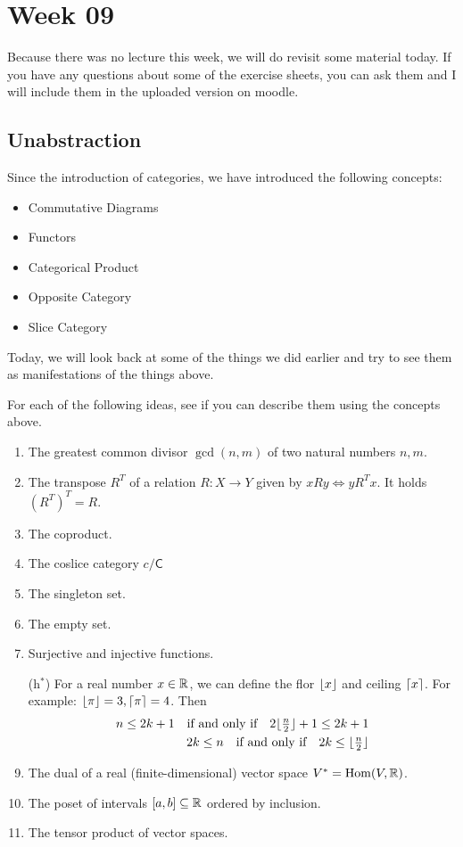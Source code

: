 \section{Week 09}
Because there was no lecture this week, we will do revisit some material today. 
If you have any questions about some of the exercise sheets, you can ask them and I will include them in the uploaded version on moodle.

\subsection{Unabstraction}
Since the introduction of categories, we have introduced the following concepts:
\begin{itemize}
  \item Commutative Diagrams
  \item Functors
  \item Categorical Product
  \item Opposite Category
  \item Slice Category
\end{itemize}

Today, we will look back at some of the things we did earlier and try to see them as manifestations of the things above.

For each of the following ideas, see if you can describe them using the concepts above.

\begin{enumerate}
  \item The greatest common divisor $\gcd(n,m)$ of two natural numbers $n,m$. 
  \item The transpose $R^{T}$ of a relation $R: X \to Y$ given by $x R y \iff y R^{T}x$. It holds ${(R^{T})}^{T} = R$.
  \item The coproduct.
  \item The coslice category $c/\textsf{C}$
  \item The singleton set.
  \item The empty set.
  \item Surjective and injective functions.
  \item[(h$^{\ast}$)] For a real number $x \in \mathbb{R}$, we can define the flor $\lfloor x\rfloor$ and ceiling $\lceil x\rceil$. For example: $\lfloor\pi\rfloor = 3, \lceil\pi\rceil = 4$.
    Then
    \begin{align*}
      n \leq 2k + 1
      \quad \text{if and only if} \quad 
      2 \lfloor\tfrac{n}{2}\rfloor + 1 \leq 2k + 1
      \\
      2k \leq n
      \quad \text{if and only if} \quad 
      2k \leq \lfloor\tfrac{n}{2}\rfloor
    \end{align*}
    \setcounter{enumi}{8}
  \item The dual of a real (finite-dimensional) vector space $V^{\ast} = \operatorname{Hom}(V,\mathbb{R})$.
  \item The poset of intervals $[a,b] \subseteq \mathbb{R}$ ordered by inclusion.
  \item The tensor product of vector spaces.
\end{enumerate}



